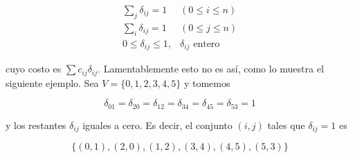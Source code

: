 \documentclass[10pt]{article}
\begin{document}
\[
\begin{array}{ll}
\sum_{j} \delta_{i j}=1 & (0 \leq i \leq n) \\
\sum_{i} \delta_{i j}=1 & (0 \leq j \leq n)  \tag{9}\\
0 \leq \delta_{i j} \leq 1, & \delta_{i j} \text { entero }
\end{array}
\]

cuyo costo es $\sum c_{i j} \delta_{i j}$. Lamentablemente esto no es así, como lo muestra el siguiente ejemplo. Sea $V=\{0,1,2,3,4,5\}$ y tomemos

$$
\delta_{01}=\delta_{20}=\delta_{12}=\delta_{34}=\delta_{45}=\delta_{53}=1
$$

y los restantes $\delta_{i j}$ iguales a cero. Es decir, el conjunto $(i, j)$ tales que $\delta_{i j}=1$ es

$$
\{(0,1),(2,0),(1,2),(3,4),(4,5),(5,3)\}
$$
\end{document}
